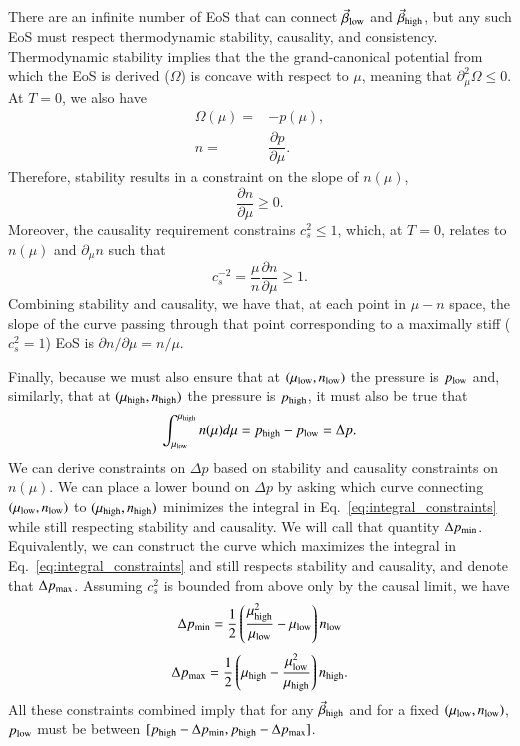 \documentclass[aps,prd,nofootinbib,tightenlines,notitlepage,floatfix,superscriptaddress,showkeys,twocolumn]{revtex4-1}
\begin{document}
There are an infinite number of EoS that can connect $\vec{\beta}_{\rm low}$ and $\vec{\beta}_{\rm high}$, but any such EoS must respect thermodynamic stability, causality, and consistency. Thermodynamic stability implies that the the grand-canonical potential from which the EoS is derived ($\Omega$) is concave with respect to $\mu$, meaning that $\partial_\mu^2 \Omega \leq 0$. At $T=0$, we also have 
\begin{eqnarray}
    \Omega(\mu) = & -p(\mu),\\
    n = & \dfrac{\partial p}{\partial \mu}.
\end{eqnarray}
Therefore, stability results in a constraint on the slope of $n(\mu)$,
\begin{equation}
    \dfrac{\partial n}{\partial \mu} \geq 0.
\end{equation}
Moreover, the causality requirement constrains $c_s^2 \leq 1$, which, at $T=0$, relates to $n(\mu)$ and $\partial_\mu n$ such that
\begin{equation}
    c_s^{-2} = \frac{\mu}{n}\dfrac{\partial n }{\partial \mu } \geq 1.
\end{equation}
Combining stability and causality, we have that, at each point in $\mu - n$ space, the slope of the curve passing through that point corresponding to a maximally stiff ($c_s^2 = 1$) EoS is $\partial n / \partial \mu = n/\mu$.

Finally, because we must also ensure that at $(\mu_{\rm low},n_{\rm low})$ the pressure is $p_{\rm low}$ and, similarly, that at $(\mu_{\rm high},n_{\rm high})$ the pressure is $p_{\rm high}$, it must also be true that
\begin{equation}\label{eq:integral_constraints}
    \int_{\mu_{\rm low}}^{\mu_{\rm high}} n(\mu)d\mu = p_{\rm high} - p_{\rm low} = \Delta p. 
\end{equation}
We can derive constraints on $\Delta p$ based on stability and causality constraints on $n(\mu)$. We can place a lower bound on $\Delta p$ by asking which curve connecting $(\mu_{\rm low},n_{\rm low})$ to $(\mu_{\rm high},n_{\rm high})$ minimizes the integral in Eq.~\eqref{eq:integral_constraints} while still respecting stability and causality. We will call that quantity $\Delta p_{\rm min}$. Equivalently, we can construct the curve which maximizes the integral in Eq.~\ref{eq:integral_constraints} and still respects stability and causality, and denote that $\Delta p_{\rm max}$. Assuming $c_s^2$ is bounded from above only by the causal limit, we have \cite{Komoltsev:2021jzg}
\begin{equation}\label{eq:plow}
    \Delta p_{\rm min}  = \dfrac{1}{2}\left(\dfrac{\mu_{\rm high}^2}{\mu_{\rm low}} - \mu_{\rm low}\right)n_{\rm low}
\end{equation}
\begin{equation}\label{eq:phigh}
    \Delta p_{\rm max}  = \dfrac{1}{2}\left( \mu_{\rm high} - \dfrac{\mu_{\rm low}^2}{\mu_{\rm high}}\right)n_{\rm high}.
\end{equation}
All these constraints combined imply that for any $\vec{\beta}_{\rm high}$ and for a fixed $(\mu_{\rm low}, n_{\rm low})$, $p_{\rm low}$ must be between $[p_{\rm high} - \Delta p_{\rm min}, p_{\rm high} - \Delta p_{\rm max}]$.
\end{document}

